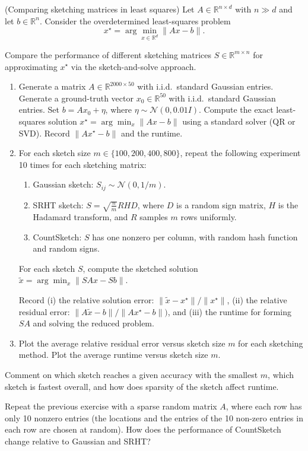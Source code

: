 \begin{myexercise}(Comparing sketching matrices in least squares)
Let $A \in \mathbb{R}^{n \times d}$ with $n \gg d$ and let $b \in \mathbb{R}^n$. Consider the overdetermined least-squares problem
$$
x^\star = \arg\min_{x \in \mathbb{R}^d} \|Ax - b\|.
$$

Compare the performance of different sketching matrices $S \in \mathbb{R}^{m \times n}$ for approximating $x^\star$ via the sketch-and-solve approach.
\begin{enumerate}
\item Generate a matrix $A \in \mathbb{R}^{2000 \times 50}$ with i.i.d.\ standard Gaussian entries. Generate a ground-truth vector $x_0 \in \mathbb{R}^{50}$ with i.i.d.\ standard Gaussian entries. Set $b = Ax_0 + \eta$, where $\eta \sim \mathcal{N}(0, 0.01 I)$.
Compute the exact least-squares solution
$x^\star = \arg\min_x \|Ax - b\|$
using a standard solver (QR or SVD).
Record $\|Ax^\star - b\|$ and the runtime.

\item 
For each sketch size $m \in \{100, 200, 400, 800\}$, repeat the following experiment 10 times for each sketching matrix:
\begin{enumerate}
\item Gaussian sketch: $S_{ij} \sim \mathcal{N}(0, 1/m)$.
\item SRHT sketch:
$S = \sqrt{\frac{n}{m}} R H D$, where $D$ is a random sign matrix, $H$ is the Hadamard transform, and $R$ samples $m$ rows uniformly.
\item CountSketch: $S$ has one nonzero per column, with random hash function and random signs.
\end{enumerate}

For each sketch $S$, compute the sketched solution
$\tilde{x} = \arg\min_x \|SAx - Sb\|$.

Record (i) the relative solution error: $\|\tilde{x} - x^\star\| / \|x^\star\|$, (ii) the relative residual error: $\|A\tilde{x} - b\| / \|Ax^\star - b\|)$, and (iii) the runtime for forming $SA$ and solving the reduced problem.
\item 
Plot the average relative residual error versus sketch size $m$ for each sketching method. Plot the average runtime versus sketch size $m$.
\end{enumerate}

Comment on which sketch reaches a given accuracy with the smallest $m$, which sketch is fastest overall, and 
how does sparsity of the sketch affect runtime.

\begin{myexercise}
Repeat the previous exercise with a sparse random matrix $A$, where each row has only 10 nonzero entries (the locations and the entries of the 10 non-zero entries in each row are chosen at random).  How does the performance of CountSketch change relative to Gaussian and SRHT?
\end{myexercise}


\end{myexercise}

